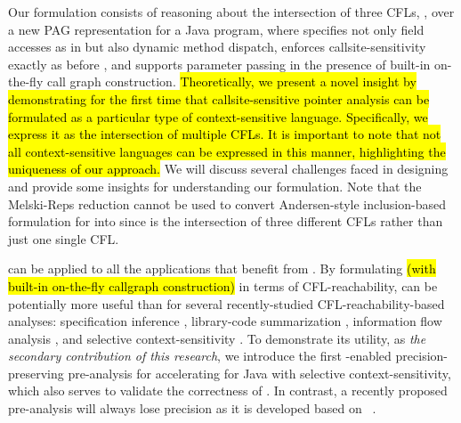Our formulation consists of reasoning about the intersection of three  CFLs, \capLFCR, 
over a new PAG representation for a Java program,
where \LF specifies not only field accesses
as in \manuLF but also  dynamic method dispatch, \LC  enforces  callsite-sensitivity
exactly as before \cite{sridharan2006refinement}, and  \LR supports parameter passing in the presence of built-in
on-the-fly call graph construction.
\hl{Theoretically, we present a novel insight by demonstrating for the first time that callsite-sensitive pointer analysis can be formulated as a particular type of context-sensitive language. Specifically, we express it as the intersection of multiple CFLs. It is important to note that not all context-sensitive languages can be expressed in this manner\cite{liu1973infinite, Latta1993phdthesis}, highlighting the uniqueness of our approach.}
We will discuss several challenges faced in designing \LFCR
and provide some insights for understanding our  formulation. Note that the
 Melski-Reps reduction \cite{melski2000interconvertibility} cannot be used to convert Andersen-style
 inclusion-based formulation for  into \LFCR  since  \LFCR is the intersection of three different
 CFLs rather than just one single CFL.
 
\LFCR can be applied to all the applications that benefit from
\manuLFC.
By formulating  
\hl{(with built-in on-the-fly callgraph construction)} %
in terms of CFL-reachability,  
\LFCR can be potentially more useful than \manuLFC
for several recently-studied CFL-reachability-based
analyses:
specification inference \cite{Bastani15PLDI},
library-code summarization \cite{shang2012demand, tang2015summary},
  information flow analysis \cite{li2020fast, milanova2020flowcfl}, and
 selective context-sensitivity \cite{lu2021selective,li2018precision}. 
  To demonstrate
its utility,  as \emph{the secondary contribution of this research}, we introduce the first \LFCR-enabled precision-preserving pre-analysis
 for accelerating  for Java with selective context-sensitivity,
 which also serves to validate 
 the correctness of \LFCR .
 In contrast,
 a recently proposed pre-analysis \cite{lu2021selective} will always lose precision as it
 is developed 
 based on \manuLFC~\cite{sridharan2006refinement}. 

